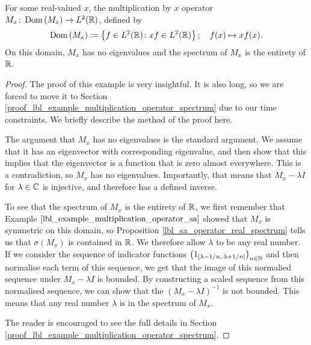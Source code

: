 \begin{example}\label{lbl_example_multiplication_operator_spectrum}
  For some real-valued $x$, the multiplication by $x$ operator $M_x \colon \operatorname{Dom}\left(M_x\right) \to L^2(\mathbb{R})$, defined by
  \begin{align*}
    \operatorname{Dom}\left(M_x\right) \coloneqq  \left\{f \in L^2(\mathbb{R}) \colon xf \in L^2(\mathbb{R})\right\}; \quad
    f(x) \mapsto xf(x).
  \end{align*}
  On this domain, $M_x$ has no eigenvalues and the spectrum of $M_x$ is the entirety of $\mathbb{R}$.
\end{example}
\begin{proof}
  The proof of this example is very insightful. It is also long, so we are forced to move it to Section \eqref{proof_lbl_example_multiplication_operator_spectrum} due to our time constraints. We briefly describe the method of the proof here.

  \medskip

  The argument that $M_x$ has no eigenvalues is the standard argument. We assume that it has an eigenvector with corresponding eigenvalue, and then show that this implies that the eigenvector is a function that is zero almost everywhere. This is a contradiction, so $M_x$ has no eigenvalues. Importantly, that means that $M_x - \lambda I$ for $\lambda \in \mathbb{C}$ is injective, and therefore has a defined inverse.

  \medskip

  To see that the spectrum of $M_x$ is the entirety of $\mathbb{R}$, we first remember that Example $\eqref{lbl_example_multiplication_operator_sa}$ showed that $M_x$ is symmetric on this domain, so Proposition \eqref{lbl_sa_operator_real_spectrum} tells us that $\sigma(M_x)$ is contained in $\mathbb{R}$. We therefore allow $\lambda$ to be any real number. If we consider the sequence of indicator functions $\left(1_{[\lambda - 1/n,\, \lambda + 1/n]} \right)_{n \in \mathbb{N}}$ and then normalise each term of this sequence,  we get that the image of this normalied sequence under $M_x - \lambda I$ is bounded. By constructing a scaled sequence from this normalised sequence, we can show that the $(M_x - \lambda I)^{-1}$ is not bounded. This means that any real number $\lambda$ is in the spectrum of $M_x$.

  \medskip

  The reader is encouraged to see the full details in Section \eqref{proof_lbl_example_multiplication_operator_spectrum}.
\end{proof}

